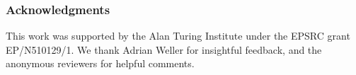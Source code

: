\documentclass{article}
\begin{document}
\subsubsection*{Acknowledgments}

This work was supported by the Alan Turing Institute under the EPSRC
grant EP/N510129/1. We thank Adrian Weller for insightful feedback, and the anonymous reviewers for helpful comments.




\newpage

\end{document}
